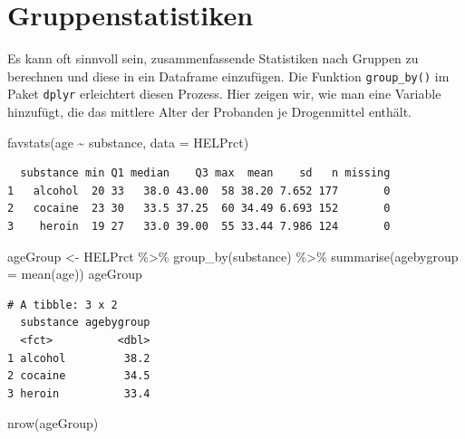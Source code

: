 \documentclass[
  ngerman,
]{scrbook}
\newenvironment{Shaded}{\begin{snugshade}}{\end{snugshade}}
\newcommand{\AttributeTok}[1]{\textcolor[rgb]{0.77,0.63,0.00}{#1}}
\newcommand{\FunctionTok}[1]{\textcolor[rgb]{0.00,0.00,0.00}{#1}}
\newcommand{\NormalTok}[1]{#1}
\newcommand{\OtherTok}[1]{\textcolor[rgb]{0.56,0.35,0.01}{#1}}
\newcommand{\SpecialCharTok}[1]{\textcolor[rgb]{0.00,0.00,0.00}{#1}}
\begin{document}
\hypertarget{gruppenstatistiken}{%
\section{Gruppenstatistiken}\label{gruppenstatistiken}}

Es kann oft sinnvoll sein, zusammenfassende Statistiken nach Gruppen zu berechnen und diese in ein Dataframe einzufügen. Die Funktion \texttt{group\_by()} im Paket \texttt{dplyr} erleichtert diesen Prozess. Hier zeigen wir, wie man eine Variable hinzufügt, die das mittlere Alter der Probanden je Drogenmittel enthält.

\begin{Shaded}
\begin{Highlighting}[]
\FunctionTok{favstats}\NormalTok{(age }\SpecialCharTok{\textasciitilde{}}\NormalTok{ substance, }\AttributeTok{data =}\NormalTok{ HELPrct)}
\end{Highlighting}
\end{Shaded}

\begin{verbatim}
  substance min Q1 median    Q3 max  mean    sd   n missing
1   alcohol  20 33   38.0 43.00  58 38.20 7.652 177       0
2   cocaine  23 30   33.5 37.25  60 34.49 6.693 152       0
3    heroin  19 27   33.0 39.00  55 33.44 7.986 124       0
\end{verbatim}

\begin{Shaded}
\begin{Highlighting}[]
\NormalTok{ageGroup }\OtherTok{\textless{}{-}}\NormalTok{ HELPrct }\SpecialCharTok{\%\textgreater{}\%}
  \FunctionTok{group\_by}\NormalTok{(substance) }\SpecialCharTok{\%\textgreater{}\%}
  \FunctionTok{summarise}\NormalTok{(}\AttributeTok{agebygroup =} \FunctionTok{mean}\NormalTok{(age))}
\NormalTok{ageGroup}
\end{Highlighting}
\end{Shaded}

\begin{verbatim}
# A tibble: 3 x 2
  substance agebygroup
  <fct>          <dbl>
1 alcohol         38.2
2 cocaine         34.5
3 heroin          33.4
\end{verbatim}

\begin{Shaded}
\begin{Highlighting}[]
 \FunctionTok{nrow}\NormalTok{(ageGroup)}
\end{Highlighting}
\end{Shaded}
\end{document}
